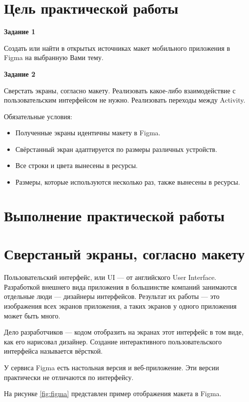 \section*{\LARGE Цель практической работы}

\textbf{Задание 1}

Создать или найти в открытых источниках макет мобильного приложения в
Figma на выбранную Вами тему.

\textbf{Задание 2}

Сверстать экраны, согласно макету. Реализовать какое-либо взаимодействие с
пользовательским интерфейсом не нужно.
Реализовать переходы между Activity.

Обязательные условия:

\begin{itemize}
	\item Полученные экраны идентичны макету в Figma.
	\item Свёрстанный экран адаптируется по размеры различных устройств.
	\item Все строки и цвета вынесены в ресурсы.
	\item Размеры, которые используются несколько раз,
		также вынесены в ресурсы.
\end{itemize}

\clearpage

\section*{\LARGE Выполнение практической работы}

\section{Сверстаный экраны, согласно макету}

Пользовательский интерфейс, или UI --- от английского User Interface.
Разработкой внешнего вида приложения в большинстве компаний
занимаются отдельные люди --- дизайнеры интерфейсов. Результат их работы
--- это изображения всех экранов приложения, а таких экранов у одного
приложения может быть много.\par
Дело разработчиков --- кодом отобразить на экранах этот интерфейс в
том виде, как его нарисовал дизайнер. Создание интерактивного
пользовательского интерфейса называется вёрсткой.\par
У сервиса Figma есть настольная версия и веб-приложение. Эти версии
практически не отличаются по интерфейсу.\par
На рисунке \ref{fig:figma} представлен пример отображения макета в Figma.

